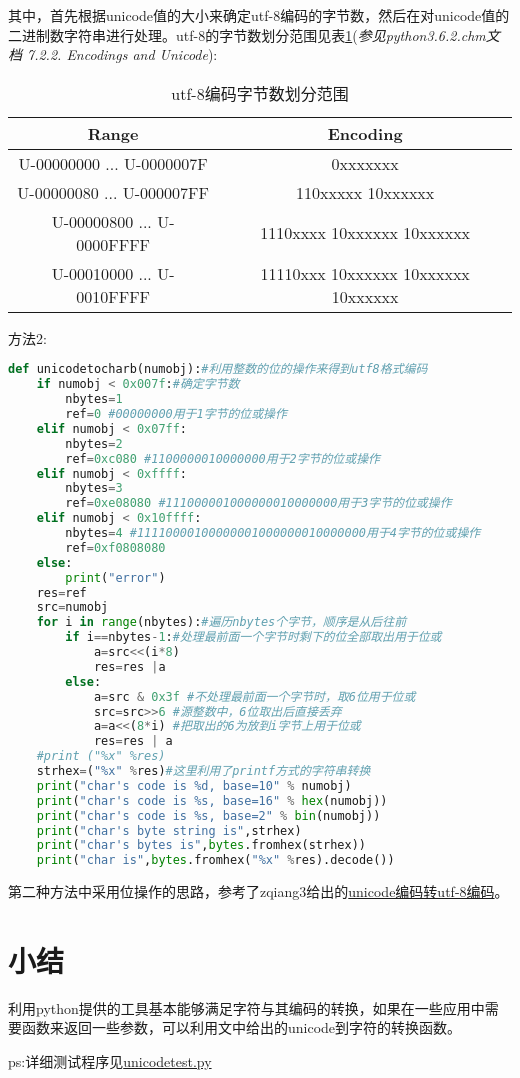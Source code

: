 \documentclass[twoside,11pt]{book}
\begin{document}
其中，首先根据unicode值的大小来确定utf-8编码的字节数，然后在对unicode值的二进制数字符串进行处理。utf-8的字节数划分范围见表\ref{tab:utf-8:bytes}(\emph{参见python3.6.2.chm文档 7.2.2. Encodings and Unicode}):
\begin{table}[!htb]
  \centering
  \caption{utf-8编码字节数划分范围}\label{tab:utf-8:bytes}
  \begin{tabular}{|c|c|}
    \hline
    Range & Encoding \\\hline
    U-00000000 ... U-0000007F & 0xxxxxxx \\
    U-00000080 ... U-000007FF & 110xxxxx 10xxxxxx \\
    U-00000800 ... U-0000FFFF & 1110xxxx 10xxxxxx 10xxxxxx \\
    U-00010000 ... U-0010FFFF & 11110xxx 10xxxxxx 10xxxxxx 10xxxxxx \\
    \hline
  \end{tabular}
\end{table}



方法2:
\begin{lstlisting}[language=python]
def unicodetocharb(numobj):#利用整数的位的操作来得到utf8格式编码
    if numobj < 0x007f:#确定字节数
        nbytes=1
        ref=0 #00000000用于1字节的位或操作
    elif numobj < 0x07ff:
        nbytes=2
        ref=0xc080 #1100000010000000用于2字节的位或操作
    elif numobj < 0xffff:
        nbytes=3
        ref=0xe08080 #111000001000000010000000用于3字节的位或操作
    elif numobj < 0x10ffff:
        nbytes=4 #11110000100000001000000010000000用于4字节的位或操作
        ref=0xf0808080
    else:
        print("error")
    res=ref
    src=numobj
    for i in range(nbytes):#遍历nbytes个字节，顺序是从后往前
        if i==nbytes-1:#处理最前面一个字节时剩下的位全部取出用于位或
            a=src<<(i*8)
            res=res |a
        else:
            a=src & 0x3f #不处理最前面一个字节时，取6位用于位或
            src=src>>6 #源整数中，6位取出后直接丢弃
            a=a<<(8*i) #把取出的6为放到i字节上用于位或
            res=res | a
    #print ("%x" %res)
    strhex=("%x" %res)#这里利用了printf方式的字符串转换
    print("char's code is %d, base=10" % numobj)
    print("char's code is %s, base=16" % hex(numobj))
    print("char's code is %s, base=2" % bin(numobj))
    print("char's byte string is",strhex)
    print("char's bytes is",bytes.fromhex(strhex))
    print("char is",bytes.fromhex("%x" %res).decode())
\end{lstlisting}

第二种方法中采用位操作的思路，参考了zqiang3给出的\href{www.unicode.org}{unicode编码转utf-8编码}。


\section{小结}

利用python提供的工具基本能够满足字符与其编码的转换，如果在一些应用中需要函数来返回一些参数，可以利用文中给出的unicode到字符的转换函数。

ps:详细测试程序见\href{run:./unicodetest.py}{unicodetest.py}
\end{document}
